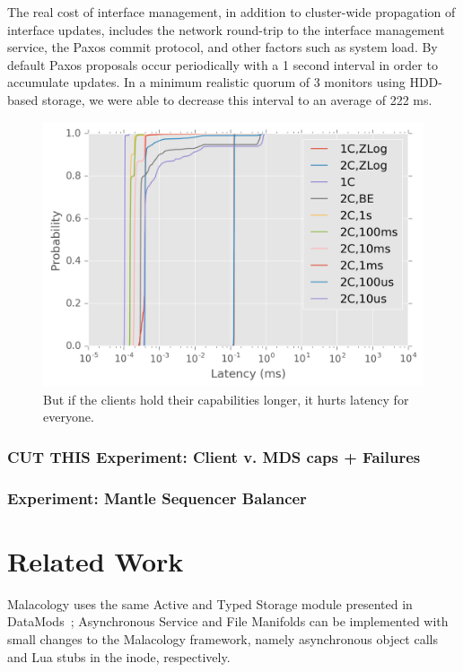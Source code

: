 \documentclass[10pt,twocolumn]{article}
\begin{document}
The real cost of interface management, in addition to cluster-wide propagation
of interface updates, includes the network round-trip to the interface
management service, the Paxos commit protocol, and other factors such as system
load. By default Paxos proposals occur periodically with a 1 second interval in
order to accumulate updates. In a minimum realistic quorum of 3 monitors using
HDD-based storage, we were able to decrease this interval to an average of 222
ms.

\begin{figure}[htbp]
\centering
\includegraphics{figures/caps-delay-latency.png}
\caption{But if the clients hold their capabilities longer, it hurts
latency for everyone.}
\end{figure}

\subsubsection{CUT THIS Experiment: Client v. MDS caps +
Failures}\label{cut-this-experiment-client-v.-mds-caps-failures}

\subsubsection{Experiment: Mantle Sequencer
Balancer}\label{experiment-mantle-sequencer-balancer}

\section{Related Work}

Malacology uses the same Active and Typed Storage module presented in
DataMods~\cite{watkins_datamods_2012}; Asynchronous Service and File
Manifolds can be implemented with small changes to the Malacology
framework, namely asynchronous object calls and Lua stubs in the inode,
respectively.
\end{document}
